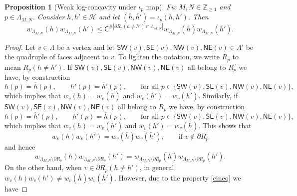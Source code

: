 \documentclass[reqno,11pt]{amsart}
\numberwithin{equation}{section}
\newtheorem{proposition}{Proposition}[section]
\theoremstyle{definition}
\begin{document}
\begin{proposition}[Weak log-concavity under $\iota_p$ map] \label{prop:inequality involution}
    Fix $M,N\in \mathbb{Z}_{\ge 1}$ and $p\in \Lambda_{M,N}$. Consider $h,h' \in \mathscr{H}$ and let $ (\overline{h},\overline{h}') = \iota_p(h,h')$. Then
    \begin{equation*}
        w_{\Lambda_{M,N}}(h) w_{\Lambda_{M,N}} (h') \le  \mathsf{C}^{\#\left| \partial R_p(h \neq h') \cap \Lambda_{M,N} \right|} w_{\Lambda_{M,N}} (\overline{h}) w_{\Lambda_{M,N}} (\overline{h}').
    \end{equation*}
\end{proposition}
\begin{proof}
     Let $v\in \Lambda$ be a vertex and let $\mathsf{SW}(v),\mathsf{SE}(v),\mathsf{NW}(v),\mathsf{NE}(v) \in \Lambda'$ be the quadruple of faces adjacent to $v$. To lighten the notation, we write $R_p$ to mean $R_p(h\neq h')$. If $\mathsf{SW}(v),\mathsf{SE}(v),\mathsf{NW}(v),\mathsf{NE}(v)$ all belong to $R_p^{\mathrm{c}}$ we have, by construction
    \begin{equation*}
        h(p) = \overline{h}(p), \qquad h'(p) = \overline{h}'(p),
        \qquad \text{for all } p\in \{ \mathsf{SW}(v),\mathsf{SE}(v),\mathsf{NW}(v),\mathsf{NE}(v) \},
    \end{equation*}
    which implies that $w_v(h) = w_v(\overline{h})$ and $w_v(h') = w_v(\overline{h}').$
    Similarly, if $\mathsf{SW}(v),\mathsf{SE}(v),\mathsf{NW}(v),\mathsf{NE}(v)$ all belong to $R_p$ we have, by construction
    \begin{equation*}
        h(p) = \overline{h}'(p), \qquad h'(p) = \overline{h}(p),
        \qquad \text{for all } p\in \{ \mathsf{SW}(v),\mathsf{SE}(v),\mathsf{NW}(v),\mathsf{NE}(v) \},
    \end{equation*}
    which implies that $w_v(h) = w_v(\overline{h}')$ and $w_v(h') = w_v(\overline{h})$.
    This shows that
    \begin{equation*}
        w_v(h) w_v(h') = w_v(\overline{h}) w_v(\overline{h}'), \qquad \text{if } v \notin \partial R_p
    \end{equation*}
    and hence
    \begin{equation} \label{eq:weights not on Rp}
        w_{\Lambda_{M,N} \setminus \partial R_p }(h) w_{\Lambda_{M,N} \setminus \partial R_p }(h') = w_{\Lambda_{M,N} \setminus \partial R_p }(\overline{h}) w_{\Lambda_{M,N} \setminus \partial R_p }(\overline{h}').
    \end{equation}
    On the other hand, when $v\in \partial R_p(h\neq h')$, in general $w_v(h) w_v(h') \neq w_v(\overline{h}) w_v(\overline{h}')$. However, due to the property \eqref{cineq} we have

\end{proof}
\end{document}
